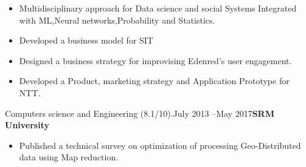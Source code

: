 \documentclass[10pt,a4paper]{altacv}
\begin{document}

\begin{fullwidth}
\makecvheader
\end{fullwidth}

%

\begin{itemize}
\item Multidisciplinary approach for Data science and social Systems Integrated with ML,Neural networks,Probability and Statistics. 

\end{itemize}
\divider

\begin{itemize}
\item Developed a business model for SIT 
\item Designed a business strategy for improvising Edenred's user engagement.
\item Developed a Product, marketing strategy and Application Prototype for NTT. 

\end{itemize}

\divider

 {Computers science and Engineering (8.1/10).}{July 2013 --May 2017}{\textbf{SRM University}}
\begin{itemize}
\item Published a technical survey on optimization of processing Geo-Distributed data using Map reduction.
\end{itemize}
\end{document}
